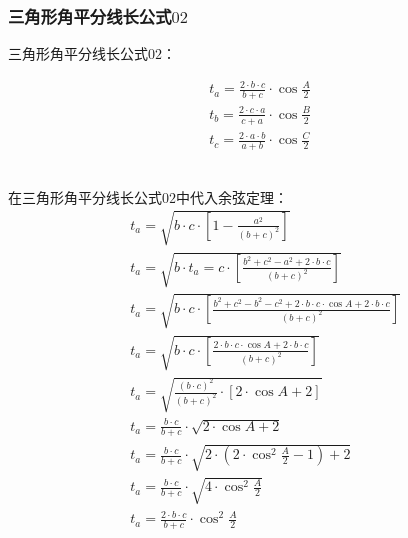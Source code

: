 \documentclass[UTF8]{ctexart}
\begin{document}
\newpage

\subsubsection{三角形角平分线长公式$02$}
    三角形角平分线长公式$02$：
    \begin{large}
        \begin{align*}
            t_a=\frac{2\cdot b\cdot c}{b+c}\cdot\cos{\frac{A}{2}}\\[3mm]
            t_b=\frac{2\cdot c\cdot a}{c+a}\cdot\cos{\frac{B}{2}}\\[3mm]
            t_c=\frac{2\cdot a\cdot b}{a+b}\cdot\cos{\frac{C}{2}}
        \end{align*}
    \end{large}\\
    在三角形角平分线长公式$02$中代入余弦定理：\vspace{8pt}
    \setcounter{equation}{0}
    \begin{align}
        &t_a=\sqrt{b\cdot c\cdot\left[1-\frac{a^2}{(b+c)^2}\right]}\\[3mm]
        &t_a=\sqrt{b\cdot t_a=c\cdot\left[\frac{b^2+c^2-a^2+2\cdot b\cdot c}{(b+c)^2}\right]}\\[3mm]
        &t_a=\sqrt{b\cdot c\cdot\left[\frac{b^2+c^2-b^2-c^2+2\cdot b\cdot c\cdot\cos{A}+2\cdot b\cdot c}{(b+c)^2}\right]}\\[3mm]
        &t_a=\sqrt{b\cdot c\cdot\left[\frac{2\cdot b\cdot c\cdot\cos{A}+2\cdot b\cdot c}{(b+c)^2}\right]}\\[3mm]
        &t_a=\sqrt{\frac{(b\cdot c)^2}{(b+c)^2}\cdot\left[2\cdot\cos{A}+2\right]}\\[3mm]
        &t_a=\frac{b\cdot c}{b+c}\cdot\sqrt{2\cdot\cos{A}+2}\\[3mm]
        &t_a=\frac{b\cdot c}{b+c}\cdot\sqrt{2\cdot\left(2\cdot\cos^2{\frac{A}{2}}-1\right)+2}\\[3mm]
        &t_a=\frac{b\cdot c}{b+c}\cdot\sqrt{4\cdot\cos^2{\frac{A}{2}}}\\[3mm]
        &t_a=\frac{2\cdot b\cdot c}{b+c}\cdot\cos^2{\frac{A}{2}}
    \end{align}
\end{document}
